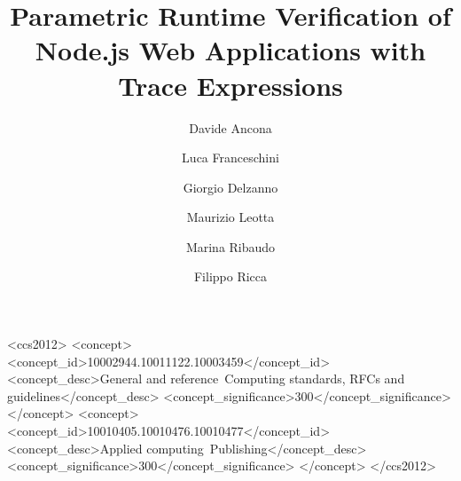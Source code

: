 \documentclass[english,submission]{programming}
\begin{document}
\title{Parametric Runtime Verification of Node.js Web Applications with Trace Expressions}
\subtitle{}%

\author{Davide Ancona}
\author{Luca Franceschini}
\author{Giorgio Delzanno}
\author{Maurizio Leotta}
\author{Marina Ribaudo}
\author{Filippo Ricca}






\begin{CCSXML}
<ccs2012>
<concept>
<concept_id>10002944.10011122.10003459</concept_id>
<concept_desc>General and reference~Computing standards, RFCs and guidelines</concept_desc>
<concept_significance>300</concept_significance>
</concept>
<concept>
<concept_id>10010405.10010476.10010477</concept_id>
<concept_desc>Applied computing~Publishing</concept_desc>
<concept_significance>300</concept_significance>
</concept>
</ccs2012>
\end{CCSXML}
\end{document}
